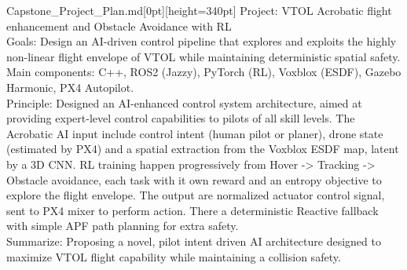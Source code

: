 \begin{twmnotebook}{Capstone\_Project\_Plan.md}[0pt][height=340pt]
    \textcolor{chillblue}{Project: VTOL Acrobatic flight enhancement and Obstacle Avoidance with RL}\\
    \textcolor{chillgreen}{Goals:} Design an AI-driven control pipeline that explores and exploits the highly non-linear flight envelope of VTOL while maintaining deterministic spatial safety.\\
    \textcolor{chillgreen}{Main components:} C++, ROS2 (Jazzy), PyTorch (RL), Voxblox (ESDF), Gazebo Harmonic, PX4 Autopilot.\\
    \textcolor{chillgreen}{Principle:} Designed an AI-enhanced control system architecture, aimed at providing expert-level control capabilities to pilots of all skill levels. The Acrobatic AI input include control intent (human pilot or planer), drone state (estimated by PX4) and a spatial extraction from the Voxblox ESDF map, latent by a 3D CNN. RL training happen progressively from Hover -> Tracking -> Obstacle avoidance, each task with it own reward and an entropy objective to explore the flight envelope. The output are normalized actuator control signal, sent to PX4 mixer to perform action. There a deterministic Reactive fallback with simple APF path planning for extra safety.\\
    \textcolor{chillgreen}{Summarize:} Proposing a novel, pilot intent driven AI architecture designed to maximize VTOL flight capability while maintaining a collision safety.
\end{twmnotebook}


